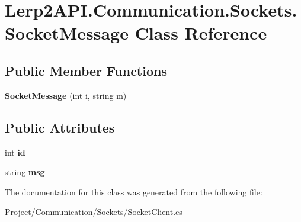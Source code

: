 \hypertarget{class_lerp2_a_p_i_1_1_communication_1_1_sockets_1_1_socket_message}{}\section{Lerp2\+A\+P\+I.\+Communication.\+Sockets.\+Socket\+Message Class Reference}
\label{class_lerp2_a_p_i_1_1_communication_1_1_sockets_1_1_socket_message}
\subsection*{Public Member Functions}
\begin{DoxyCompactItemize}
\item 
\mbox{\label{class_lerp2_a_p_i_1_1_communication_1_1_sockets_1_1_socket_message_a7a00c74845f8a7414683705f9320e693}} 
{\bfseries Socket\+Message} (int i, string m)
\end{DoxyCompactItemize}
\subsection*{Public Attributes}
\begin{DoxyCompactItemize}
\item 
\mbox{\label{class_lerp2_a_p_i_1_1_communication_1_1_sockets_1_1_socket_message_ad2ae1ca22e7122f381d8cdf18e1609c9}} 
int {\bfseries id}
\item 
\mbox{\label{class_lerp2_a_p_i_1_1_communication_1_1_sockets_1_1_socket_message_a5709cbeaa3cbb5e6e752d240b8f73f9b}} 
string {\bfseries msg}
\end{DoxyCompactItemize}


The documentation for this class was generated from the following file\+:\begin{DoxyCompactItemize}
\item 
Project/\+Communication/\+Sockets/Socket\+Client.\+cs\end{DoxyCompactItemize}
